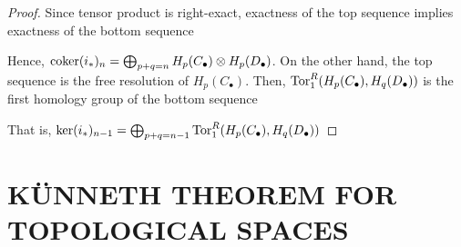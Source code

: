 \documentclass{article}
\begin{document}
\begin{proof}
    Since tensor product is right-exact, exactness of the top sequence implies exactness of the bottom sequence
    \begin{center}
    \end{center}

    Hence, $\operatorname{coker}(i_*)_n = \bigoplus_{p + q = n} H_p(C_\bullet) \otimes H_p(D_\bullet)$. On the other hand, the top sequence is the free resolution of $H_p(C_\bullet)$. Then, $\operatorname{Tor}^R_1(H_p(C_\bullet), H_q(D_\bullet))$ is the first homology group of the bottom sequence
    \begin{center}
    \end{center}

    That is, $\ker(i_*)_{n-1} = \bigoplus_{p + q = n-1} \operatorname{Tor}^R_1(H_p(C_\bullet), H_q(D_\bullet))$


\end{proof}










\section{KÜNNETH THEOREM FOR TOPOLOGICAL SPACES}
\end{document}
